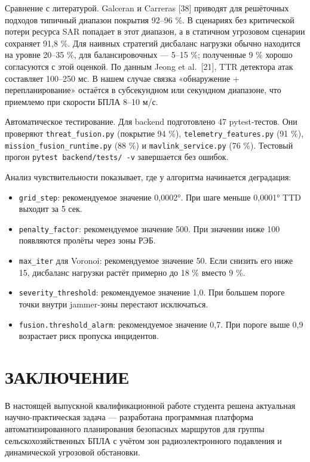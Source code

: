 \documentclass[14pt,a4paper]{extarticle}
\begin{document}
Сравнение с литературой. Galceran и Carreras {[}38{]} приводят для решёточных подходов типичный диапазон покрытия 92--96 \%. В сценариях без критической потери ресурса SAR попадает в этот диапазон, а в статичном угрозовом сценарии сохраняет 91,8 \%. Для наивных стратегий дисбаланс нагрузки обычно находится на уровне 20--35 \%, для балансировочных --- 5--15 \%; полученные 9 \% хорошо согласуются с этой оценкой. По данным Jeong et al.~{[}21{]}, TTR детектора атак составляет 100--250 мс. В нашем случае связка «обнаружение + перепланирование» остаётся в субсекундном или секундном диапазоне, что приемлемо при скорости БПЛА 8--10 м/с.

Автоматическое тестирование. Для backend подготовлено 47 pytest-тестов. Они проверяют \texttt{threat\_fusion.py} (покрытие 94 \%), \texttt{telemetry\_features.py} (91 \%), \texttt{mission\_fusion\_runtime.py} (88 \%) и \texttt{mavlink\_service.py} (76 \%). Тестовый прогон \texttt{pytest\ backend/tests/\ -v} завершается без ошибок.

Анализ чувствительности показывает, где у алгоритма начинается деградация:

\begin{itemize}
\item \texttt{grid\_step}: рекомендуемое значение 0,0002°. При шаге меньше 0,0001° TTD выходит за 5 сек.
\item \texttt{penalty\_factor}: рекомендуемое значение 500. При значении ниже 100 появляются пролёты через зоны РЭБ.
\item \texttt{max\_iter} для Voronoi: рекомендуемое значение 50. Если снизить его ниже 15, дисбаланс нагрузки растёт примерно до 18 \% вместо 9 \%.
\item \texttt{severity\_threshold}: рекомендуемое значение 1,0. При большем пороге точки внутри jammer-зоны перестают исключаться.
\item \texttt{fusion.threshold\_alarm}: рекомендуемое значение 0,7. При пороге выше 0,9 возрастает риск пропуска инцидентов.
\end{itemize}



\hypertarget{ux437ux430ux43aux43bux44eux447ux435ux43dux438ux435}{%
\section{ЗАКЛЮЧЕНИЕ}\label{ux437ux430ux43aux43bux44eux447ux435ux43dux438ux435}}

В настоящей выпускной квалификационной работе студента решена актуальная научно-практическая задача --- разработана программная платформа автоматизированного планирования безопасных маршрутов для группы сельскохозяйственных БПЛА с учётом зон радиоэлектронного подавления и динамической угрозовой обстановки.
\end{document}
